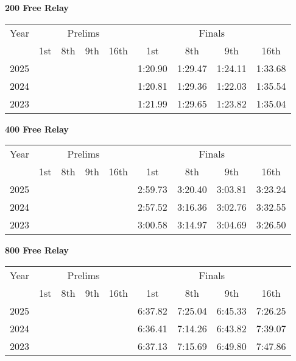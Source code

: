 \textbf{200 Free Relay}

\begin{flushleft}
\begin{tabular}{|c|c|c|c|c|c|c|c|c|}
\hline
Year & \multicolumn{4}{c|}{Prelims} & \multicolumn{4}{c|}{Finals} \\
\cline{2-9}
& 1st & 8th & 9th & 16th & 1st & 8th & 9th & 16th \\
\hline
2025 &  &  &  &  & 1:20.90 & 1:29.47 & 1:24.11 & 1:33.68 \\
2024 &  &  &  &  & 1:20.81 & 1:29.36 & 1:22.03 & 1:35.54 \\
2023 &  &  &  &  & 1:21.99 & 1:29.65 & 1:23.82 & 1:35.04 \\
\hline
\end{tabular}
\end{flushleft}

\textbf{400 Free Relay}

\begin{flushleft}
\begin{tabular}{|c|c|c|c|c|c|c|c|c|}
\hline
Year & \multicolumn{4}{c|}{Prelims} & \multicolumn{4}{c|}{Finals} \\
\cline{2-9}
& 1st & 8th & 9th & 16th & 1st & 8th & 9th & 16th \\
\hline
2025 &  &  &  &  & 2:59.73 & 3:20.40 & 3:03.81 & 3:23.24 \\
2024 &  &  &  &  & 2:57.52  & 3:16.36 & 3:02.76  & 3:32.55 \\
2023 &  &  &  &  & 3:00.58 & 3:14.97 & 3:04.69 & 3:26.50 \\
\hline
\end{tabular}
\end{flushleft}

\textbf{800 Free Relay}

\begin{flushleft}
\begin{tabular}{|c|c|c|c|c|c|c|c|c|}
\hline
Year & \multicolumn{4}{c|}{Prelims} & \multicolumn{4}{c|}{Finals} \\
\cline{2-9}
& 1st & 8th & 9th & 16th & 1st & 8th & 9th & 16th \\
\hline
2025 &  &  &  &  & 6:37.82 & 7:25.04 & 6:45.33 & 7:26.25 \\
2024 &  &  &  &  & 6:36.41 & 7:14.26 & 6:43.82 & 7:39.07 \\
2023 &  &  &  &  & 6:37.13 & 7:15.69 & 6:49.80 & 7:47.86 \\
\hline
\end{tabular}
\end{flushleft}

